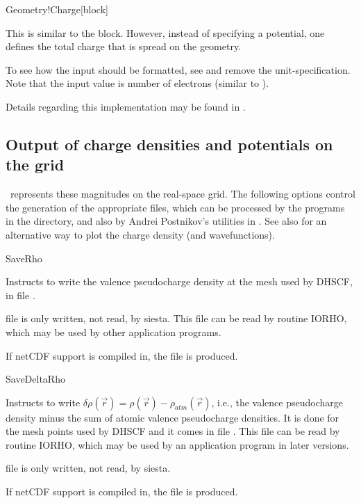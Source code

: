 \begin{fdfentry}{Geometry!Charge}[block]%

  This is similar to the  block. However,
  instead of specifying a potential, one defines the total charge that
  is spread on the geometry. 

  To see how the input should be formatted, see
   and remove the unit-specification. Note that
  the input value is number of electrons (similar to ).

  Details regarding this implementation may be found in
  \citet{Papior2016a}.

\end{fdfentry}




\subsection{Output of charge densities and potentials on the grid}

\siesta\ represents these magnitudes on the real-space grid. The
following options control the generation of the appropriate files,
which can be processed by the programs in the 
directory, and also by Andrei Postnikov's utilities in
. See also  for
an alternative way to plot the charge density (and wavefunctions).

\begin{fdflogicalF}{SaveRho}

  Instructs to write the valence pseudocharge density at the mesh used
  by DHSCF, in file .

  \note file  is only written, not read, by siesta.
  This file can be read by routine IORHO, which may be used by other
  application programs.

  If netCDF support is compiled in, the file  is
  produced.
  
\end{fdflogicalF}

\begin{fdflogicalF}{SaveDeltaRho}

  Instructs to write
  $\delta \rho(\vec r) = \rho(\vec r) - \rho_{atm}(\vec r)$, i.e., the
  valence pseudocharge density minus the sum of atomic valence
  pseudocharge densities. It is done for the mesh points used by DHSCF
  and it comes in file . This file can be
  read by routine IORHO, which may be used by an application program
  in later versions.

  \note file  is only written, not read, by siesta.

  If netCDF support is compiled in, the file 
  is produced.

\end{fdflogicalF}

